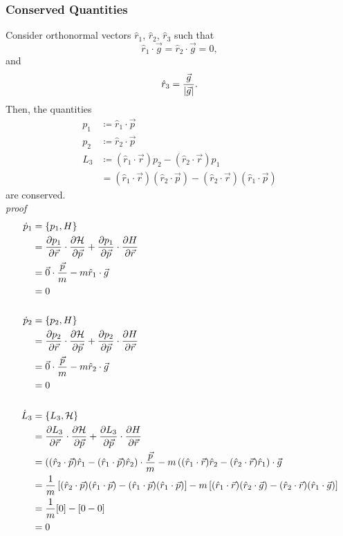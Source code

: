 \documentclass[12pt]{article}
\newcommand{\Ham}{\mathcal{H}}
\newcommand{\pos}{\vec{r}}
\newcommand{\mom}{\vec{p}}
\begin{document}
\subsubsection*{Conserved Quantities}
Consider orthonormal vectors $\hat{r}_1$, $\hat{r}_2$, $\hat{r}_3$ such that
\[ \hat{r}_1 \cdot \vec{g} = \hat{r}_2 \cdot \vec{g} = 0, \]
and 
\[ \hat{r}_3 = \frac{\vec{g}}{\abs{\vec{g}}}. \]
Then, the quantities
\begin{align*}
    p_1 &\coloneqq \hat{r}_1\cdot\mom \\
    p_2 &\coloneqq \hat{r}_2\cdot\mom \\
    L_3 &\coloneqq (\hat{r}_1\cdot\pos)p_2 - (\hat{r}_2\cdot{\pos})p_1 \\
    &= (\hat{r}_1 \cdot \pos)(\hat{r}_2 \cdot \mom) - (\hat{r}_2 \cdot \pos)(\hat{r}_1 \cdot \mom)
\end{align*}
are conserved. \\ \textit{proof}
\begin{align*}
    \dot{p}_1 &= \pb{p_1}{H} \\
    &= \pdv{p_1}{\pos}\cdot\pdv{\Ham}{\mom} + \pdv{p_1}{\mom}\cdot\pdv{H}{\pos} \\
    &= \vec{0}\cdot\frac{\mom}{m} - m\hat{r}_1\cdot\vec{g} \\
    &= 0 \\
    \\
    \dot{p}_2 &= \pb{p_2}{H} \\
    &= \pdv{p_2}{\pos}\cdot\pdv{\Ham}{\mom} + \pdv{p_2}{\mom}\cdot\pdv{H}{\pos} \\
    &= \vec{0}\cdot\frac{\mom}{m} - m\hat{r}_2\cdot\vec{g} \\
    &= 0 \\
    \\
    \dot{L}_3 &= \pb{L_3}{\Ham} \\
    &= \pdv{L_3}{\pos}\cdot\pdv{\Ham}{\mom} + \pdv{L_3}{\mom}\cdot\pdv{H}{\pos} \\
    &= \left((\hat{r}_2\cdot\mom)\hat{r}_1 - (\hat{r}_1\cdot\mom)\hat{r}_2\right)\cdot \frac{\mom}{m} - m\left((\hat{r}_1\cdot\pos)\hat{r}_2 - (\hat{r}_2\cdot\pos)\hat{r}_1\right)\cdot\vec{g} \\
    &= \frac{1}{m}\left[(\hat{r}_2\cdot\mom)(\hat{r}_1\cdot\mom) - (\hat{r}_1\cdot\mom)(\hat{r}_1\cdot\mom)\right] - m\left[(\hat{r}_1\cdot\pos)(\hat{r}_2\cdot\vec{g}) - (\hat{r}_2\cdot\pos)(\hat{r}_1\cdot\vec{g})\right] \\
    &= \frac{1}{m}[0] - [0-0] \\
    &= 0
\end{align*}
\end{document}
